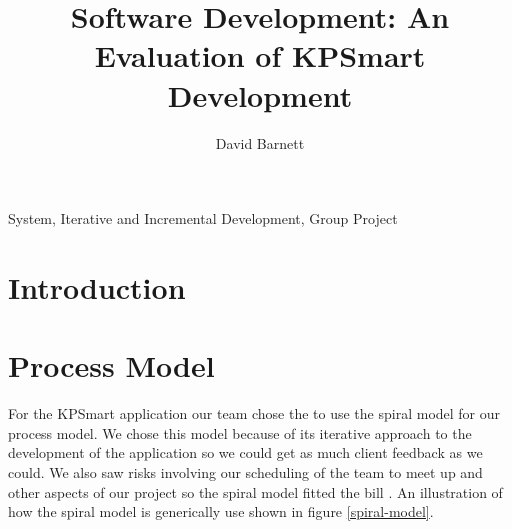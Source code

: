 \documentclass{style/CRPITStyle}
\renewcommand{\cite}{\citep}
\begin{document}
\title{Software Development: An Evaluation of KPSmart Development}
\author{David Barnett}

\maketitle

\begin{abstract}
\end{abstract}

\vspace{.1in}

\/ System, Iterative and Incremental Development, Group Project

\vspace{.1in}

\section{Introduction}

\section{Process Model}


For the KPSmart application our team chose the to use the spiral model for our
process model. We chose this model because of its iterative approach to the
development of the application so we could get as much client feedback as we
could. We also saw risks involving our scheduling of the team to meet up and other aspects
of our project so the spiral model fitted the bill \cite{boehm:1988:spiral}. 
An illustration of how the spiral model is generically use shown in figure
\ref{spiral-model}.

\vspace{.1in}
\end{document}
